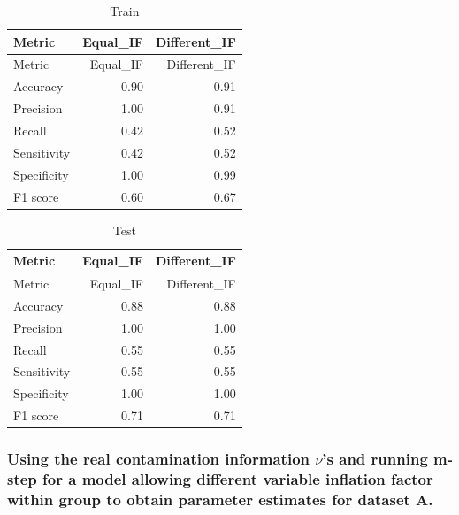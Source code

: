 \documentclass[
]{article}
\begin{document}
\begin{longtable}[]{@{}lrr@{}}
\caption{Train}\tabularnewline
\toprule\noalign{}
Metric & Equal\_IF & Different\_IF \\
\midrule\noalign{}
\endfirsthead
\toprule\noalign{}
Metric & Equal\_IF & Different\_IF \\
\midrule\noalign{}
\endhead
\bottomrule\noalign{}
\endlastfoot
Accuracy & 0.90 & 0.91 \\
Precision & 1.00 & 0.91 \\
Recall & 0.42 & 0.52 \\
Sensitivity & 0.42 & 0.52 \\
Specificity & 1.00 & 0.99 \\
F1 score & 0.60 & 0.67 \\
\end{longtable}

\begin{longtable}[]{@{}lrr@{}}
\caption{Test}\tabularnewline
\toprule\noalign{}
Metric & Equal\_IF & Different\_IF \\
\midrule\noalign{}
\endfirsthead
\toprule\noalign{}
Metric & Equal\_IF & Different\_IF \\
\midrule\noalign{}
\endhead
\bottomrule\noalign{}
\endlastfoot
Accuracy & 0.88 & 0.88 \\
Precision & 1.00 & 1.00 \\
Recall & 0.55 & 0.55 \\
Sensitivity & 0.55 & 0.55 \\
Specificity & 1.00 & 1.00 \\
F1 score & 0.71 & 0.71 \\
\end{longtable}

\hypertarget{using-the-real-contamination-information-nus-and-running-m-step-for-a-model-allowing-different-variable-inflation-factor-within-group-to-obtain-parameter-estimates-for-dataset-a.}{%
\subsubsection{\texorpdfstring{Using the real contamination information
\(\nu\)'s and running m-step for a model allowing different variable
inflation factor within group to obtain parameter estimates for dataset
A.}{Using the real contamination information \textbackslash nu's and running m-step for a model allowing different variable inflation factor within group to obtain parameter estimates for dataset A.}}\label{using-the-real-contamination-information-nus-and-running-m-step-for-a-model-allowing-different-variable-inflation-factor-within-group-to-obtain-parameter-estimates-for-dataset-a.}}
\end{document}
